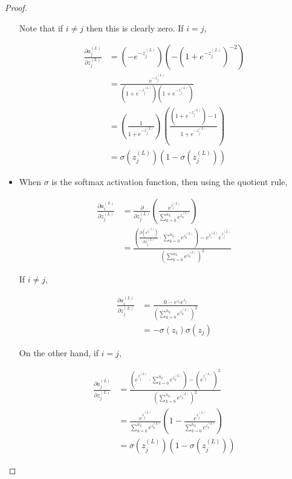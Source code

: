 \documentclass{article}[11pt]
\begin{document}
\begin{proof}
\begin{itemize}
                Note that if $i \neq j$ then this is clearly zero. If $i = j$,
                
                $$ \begin{aligned}
                \frac{\partial a^{(L)}_j}{\partial z^{(L)}_j}
                &= \left( - e^{-z^{(L)}_j} \right) \left( - \left( 1 + e^{-z^{(L)}_j} \right)^{-2} \right) \\
                &= \frac{e^{-z^{(L)}_j}}{\left( 1 + e^{-z^{(L)}_j} \right) \left( 1 + e^{-z^{(L)}_j} \right)} \\
                &= \left( \frac{1}{1 + e^{-z^{(L)}_j}} \right) \left( \frac{\left( 1 + e^{-z^{(L)}_j} \right) - 1}{1 + e^{-z^{(L)}_j}} \right) \\
                &= \sigma(z^{(L)}_j) \left( 1 - \sigma(z^{(L)}_j) \right)
                \end{aligned} $$
                
            
            
                \item When $\sigma$ is the softmax activation function, then using the quotient rule,
                
                $$ \begin{aligned}
                \frac{\partial a^{(L)}_i}{\partial z^{(L)}_j}
                &= \frac{\partial}{\partial z^{(L)}_j} \left( \frac{e^{z^{(L)}_i}}{\sum_{k=0}^{n_L} e^{z^{(L)}_k}} \right) \\
                &= \frac{\left( \frac{\partial \left( e^{z^{(L)}_i}\right)}{\partial z^{(L)}_j} \cdot \sum_{k=0}^{n_L} e^{z^{(L)}_k} \right) - e^{z^{(L)}_i} e^{z^{(L)}_j}}{\left( \sum_{k=0}^{n_L} e^{z^{(L)}_k} \right)^2}
                \end{aligned} $$
                
                
                If $i \neq j$,
               
                $$ \begin{aligned}
                \frac{\partial a^{(L)}_i}{\partial z^{(L)}_j}
                &= \frac{0 - e^{z_i} e^{z_j}}{\left( \sum_{k=0}^{n_L} e^{z^{(L)}_k} \right)^2} \\
                &= - \sigma(z_i) \sigma(z_j)
                \end{aligned} $$
                
                On the other hand, if $i = j$,
                
                $$ \begin{aligned}
                \frac{\partial a^{(L)}_j}{\partial z^{(L)}_j}
                &= \frac{\left( e^{z^{(L)}_j} \cdot \sum_{k=0}^{n_L} e^{z^{(L)}_k} \right) - \left( e^{z^{(L)}_j} \right)^2}{\left( \sum_{k=0}^{n_L} e^{z^{(L)}_k} \right)^2} \\
                &= \frac{e^{z^{(L)}_j}}{\sum_{k=0}^{n_L} e^{z^{(L)}_k}} \left( 1 - \frac{e^{z^{(L)}_j}}{\sum_{k=0}^{n_L} e^{z^{(L)}_k}} \right) \\
                &= \sigma(z^{(L)}_j) \left( 1 - \sigma(z^{(L)}_j) \right)
                \end{aligned} $$
                

\end{itemize}
\end{proof}
\end{document}
